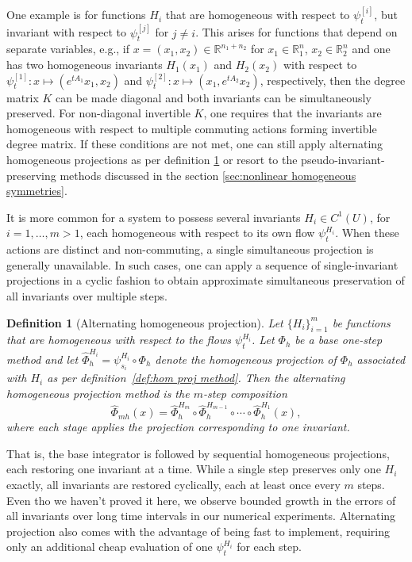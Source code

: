 \documentclass[final,3p,times]{elsarticle}
\newtheorem{definition}[theorem]{Definition}
\newcommand{\R}{\mathbb{R}}
\begin{document}
One example is for functions $H_i$ that are homogeneous with respect to $\psi^{[i]}_t$, but invariant with respect to $\psi^{[j]}_t$ for $j\neq i$. This arises for functions that depend on separate variables, e.g., if $x=(x_1, x_2)\in\R^{n_1+n_2}$ for $x_1\in\R^n_1$, $x_2\in\R^n_2$ and one has two homogeneous invariants $H_1(x_1)$ and $H_2(x_2)$ with respect to $\psi_t^{[1]}:x \mapsto (e^{tA_1}x_1, x_2)$ and $\psi_t^{[2]}:x \mapsto (x_1, e^{tA_2}x_2)$, respectively, then the degree matrix $K$ can be made diagonal and both invariants can be simultaneously preserved. For non-diagonal invertible $K$, one requires that the invariants are homogeneous with respect to multiple commuting actions forming invertible degree matrix. If these conditions are not met, one can still apply alternating homogeneous projections as per definition \ref{def:alt proj} or resort to the pseudo-invariant-preserving methods discussed in the section \ref{sec:nonlinear homogeneous symmetries}.

It is more common for a system to possess several invariants $H_i\in C^{1}(U)$, for $i=1,\ldots,m>1$, each homogeneous with respect to its own flow $\psi^{H_i}_t$. When these actions are distinct and non-commuting, a single simultaneous projection is generally unavailable. In such cases, one can apply a sequence of single-invariant projections in a cyclic fashion to obtain approximate simultaneous preservation of all invariants over multiple steps.

\begin{definition}[Alternating homogeneous projection]\label{def:alt proj}
Let $\{H_i\}_{i=1}^m$ be functions that are homogeneous with respect to the flows $\psi^{H_i}_t$. Let $\Phi_h$ be a base one-step method and let $\widehat{\Phi}_h^{H_i}=\psi^{H_i}_{s_i}\!\circ\!\Phi_h$ denote the homogeneous projection of $\Phi_h$ associated with $H_i$ as per definition~\ref{def:hom proj method}. Then the alternating homogeneous projection method is the $m$-step composition
\begin{equation}
  \widehat{\Phi}_{mh}(x)
  =\widehat{\Phi}_h^{H_m}\circ\widehat{\Phi}_h^{H_{m-1}}\circ\cdots\circ\widehat{\Phi}_h^{H_1}(x),
\end{equation}
where each stage applies the projection corresponding to one invariant.
\end{definition}

That is, the base integrator is followed by sequential homogeneous projections, each restoring one invariant at a time.  
While a single step preserves only one $H_i$ exactly, all invariants are restored cyclically, each at least once every $m$ steps. Even tho we haven't proved it here, we observe bounded growth in the errors of all invariants over long time intervals in our numerical experiments. Alternating projection also comes with the advantage of being fast to implement, requiring only an additional cheap evaluation of one $\psi^{H_i}_t$ for each step. 
\end{document}
